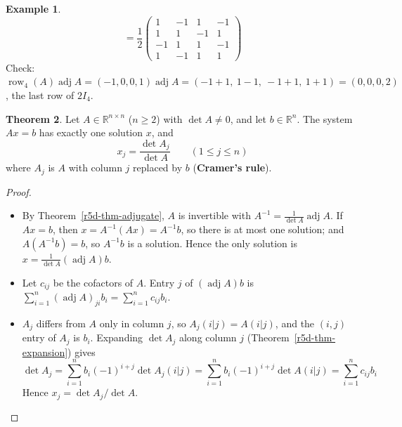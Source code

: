 \documentclass[12pt]{article}
\newcommand{\R}{\mathbb R}
\DeclareMathOperator{\row}{row}
\theoremstyle{definition}
\newtheorem{theorem}{Theorem}
\newtheorem{example}[theorem]{Example}
\begin{document}
\begin{example}
\[=\frac12\begin{pmatrix}1&-1&1&-1\\1&1&-1&1\\-1&1&1&-1\\1&-1&1&1\end{pmatrix}
\]
Check: \(\row_4(A)\operatorname{adj}A=(-1,0,0,1)\operatorname{adj}A=(-1+1,\ 1-1,\ -1+1,\ 1+1)=(0,0,0,2)\),
the last row of \(2I_4\).
\end{example}

\begin{theorem}\label{r5d-thm-cramer}
Let \(A\in\R^{n\times n}\) (\(n\geqslant2\)) with \(\det A\ne0\), and let \(b\in\R^n\). The system \(Ax=b\) has exactly
one solution \(x\), and
\[
x_j=\frac{\det A_j}{\det A}\qquad(1\leqslant j\leqslant n)
\]
where \(A_j\) is \(A\) with column \(j\) replaced by \(b\) (\textbf{Cramer's rule}).
\end{theorem}
\begin{proof}
\begin{itemize}
\item By Theorem~\ref{r5d-thm-adjugate}, \(A\) is invertible with \(A^{-1}=\frac1{\det A}\operatorname{adj}A\).
If \(Ax=b\), then \(x=A^{-1}(Ax)=A^{-1}b\), so there is at most one solution; and \(A(A^{-1}b)=b\), so
\(A^{-1}b\) is a solution. Hence the only solution is \(x=\frac1{\det A}(\operatorname{adj}A)b\).
\item Let \(c_{ij}\) be the cofactors of \(A\). Entry \(j\) of \((\operatorname{adj}A)b\) is \(\sum_{i=1}^n(\operatorname{adj}A)_{ji}b_i=\sum_{i=1}^nc_{ij}b_i\).
\item \(A_j\) differs from \(A\) only in column \(j\), so \(A_j(i|j)=A(i|j)\), and the \((i,j)\) entry
of \(A_j\) is \(b_i\). Expanding \(\det A_j\) along column \(j\) (Theorem~\ref{r5d-thm-expansion}) gives
\[
\det A_j=\sum_{i=1}^nb_i(-1)^{i+j}\det A_j(i|j)=\sum_{i=1}^nb_i(-1)^{i+j}\det A(i|j)=\sum_{i=1}^nc_{ij}b_i
\]
Hence \(x_j=\det A_j/\det A\).\qedhere
\end{itemize}
\end{proof}
\end{document}
